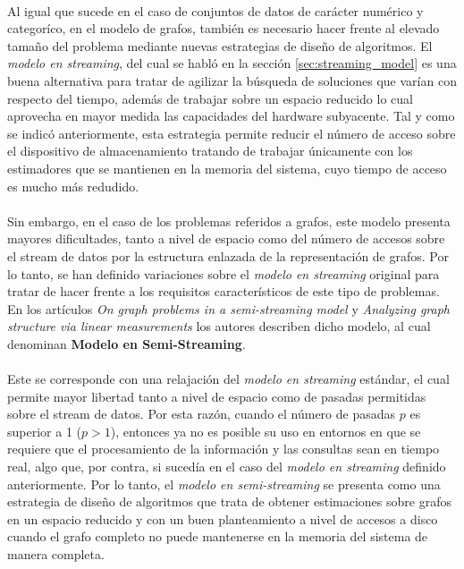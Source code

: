 \documentclass{subfiles}
\begin{document}
      \paragraph{}
      Al igual que sucede en el caso de conjuntos de datos de carácter numérico y categoríco, en el modelo de grafos, también es necesario hacer frente al elevado tamaño del problema mediante nuevas estrategias de diseño de algoritmos. El \emph{modelo en streaming}, del cual se habló en la sección \ref{sec:streaming_model} es una buena alternativa para tratar de agilizar la búsqueda de soluciones que varían con respecto del tiempo, además de trabajar sobre un espacio reducido lo cual aprovecha en mayor medida las capacidades del hardware subyacente. Tal y como se indicó anteriormente, esta estrategia permite reducir el número de acceso sobre el dispositivo de almacenamiento tratando de trabajar únicamente con los estimadores que se mantienen en la memoria del sistema, cuyo tiempo de acceso es mucho más redudido.

      \paragraph{}
      Sin embargo, en el caso de los problemas referidos a grafos, este modelo presenta mayores dificultades, tanto a nivel de espacio como del número de accesos sobre el stream de datos por la estructura enlazada de la representación de grafos. Por lo tanto, se han definido variaciones sobre el \emph{modelo en streaming} original para tratar de hacer frente a los requisitos característicos de este tipo de problemas. En los artículos \emph{On graph problems in a semi-streaming model} \cite{feigenbaum2005graph} y \emph{Analyzing graph structure via linear measurements} \cite{ahn2012analyzing} los autores describen dicho modelo, al cual denominan \textbf{Modelo en Semi-Streaming}.

      \paragraph{}
      Este se corresponde con una relajación del \emph{modelo en streaming} estándar, el cual permite mayor libertad tanto a nivel de espacio como de pasadas permitidas sobre el stream de datos. Por esta razón, cuando el número de pasadas $p$ es superior a 1 ($p > 1$), entonces ya no es posible su uso en entornos en que se requiere que el procesamiento de la información y las consultas sean en tiempo real, algo que, por contra, si sucedía en el caso del \emph{modelo en streaming} definido anteriormente. Por lo tanto, el \emph{modelo en semi-streaming} se presenta como una estrategia de diseño de algoritmos que trata de obtener estimaciones sobre grafos en un espacio reducido y con un buen planteamiento a nivel de accesos a disco cuando el grafo completo no puede mantenerse en la memoria del sistema de manera completa.
\end{document}
